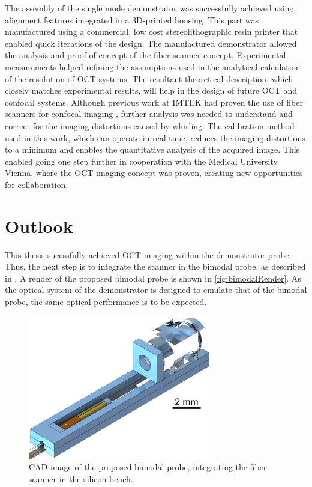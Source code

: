 The assembly of the single mode demonstrator was successfully achieved using alignment features integrated in a 3D-printed housing. This part was manufactured using a commercial, low cost stereolithographic resin printer that enabled quick iterations of the design. The manufactured demonstrator allowed the analysis and proof of concept of the fiber scanner concept. Experimental measurements helped refining the assumptions used in the analytical calculation of the resolution of OCT systems. The resultant theoretical description, which closely matches experimental results, will help in the design of future OCT and confocal systems. Although previous work at IMTEK had proven the use of fiber scanners for confocal imaging \cite{Meinert}, further analysis was needed to understand and correct for the imaging distortions caused by whirling. The calibration method used in this work, which can operate in real time, reduces the imaging distortions to a minimum and enables the quantitative analysis of the acquired image. This enabled going one step further in cooperation with the Medical University Vienna, where the OCT imaging concept was proven, creating new opportunities for collaboration. 

\section{Outlook}
This thesis sucessfully achieved OCT imaging within the demonstrator probe. Thus, the next step is to integrate the scanner in the bimodal probe, as described in \cite{vilches}. A render of the proposed bimodal probe is shown in \autoref{fig:bimodalRender}. As the optical system of the demonstrator is designed to emulate that of the bimodal probe, the same optical performance is to be expected. 

\begin{figure}[h!]\centering
      \includegraphics[width = 8cm]{figures/60_Conclusion/bimodalRender.png}
      \caption{CAD image of the proposed bimodal probe, integrating the fiber scanner in the silicon bench. \cite{vilches} }
      \label{fig:bimodalRender}
\end{figure}
